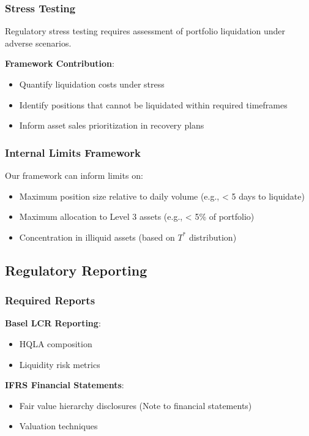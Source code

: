 \documentclass[11pt,a4paper]{article}
\begin{document}
\subsubsection{Stress Testing}

Regulatory stress testing requires assessment of portfolio liquidation under adverse scenarios.

\textbf{Framework Contribution}:
\begin{itemize}
    \item Quantify liquidation costs under stress
    \item Identify positions that cannot be liquidated within required timeframes
    \item Inform asset sales prioritization in recovery plans
\end{itemize}

\subsubsection{Internal Limits Framework}

Our framework can inform limits on:
\begin{itemize}
    \item Maximum position size relative to daily volume (e.g., < 5 days to liquidate)
    \item Maximum allocation to Level 3 assets (e.g., < 5\% of portfolio)
    \item Concentration in illiquid assets (based on $T^*$ distribution)
\end{itemize}

\subsection{Regulatory Reporting}

\subsubsection{Required Reports}

\textbf{Basel LCR Reporting}:
\begin{itemize}
    \item HQLA composition
    \item Liquidity risk metrics
\end{itemize}

\textbf{IFRS Financial Statements}:
\begin{itemize}
    \item Fair value hierarchy disclosures (Note to financial statements)
    \item Valuation techniques
\end{itemize}
\end{document}
